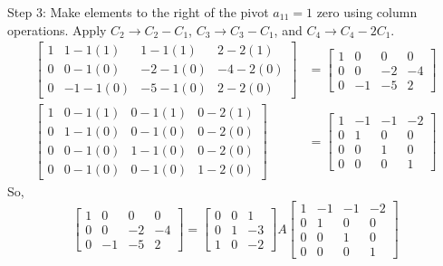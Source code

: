 \documentclass{article}
\begin{document}
Step 3: Make elements to the right of the pivot $a_{11}=1$ zero using column operations.
Apply $C_2 \to C_2 - C_1$, $C_3 \to C_3 - C_1$, and $C_4 \to C_4 - 2C_1$.
\begin{align*} \begin{bmatrix} 1 & 1 - 1(1) & 1 - 1(1) & 2 - 2(1) \\ 0 & 0 - 1(0) & -2 - 1(0) & -4 - 2(0) \\ 0 & -1 - 1(0) & -5 - 1(0) & 2 - 2(0) \end{bmatrix} &= \begin{bmatrix} 1 & 0 & 0 & 0 \\ 0 & 0 & -2 & -4 \\ 0 & -1 & -5 & 2 \end{bmatrix} \\ \begin{bmatrix} 1 & 0 - 1(1) & 0 - 1(1) & 0 - 2(1) \\ 0 & 1 - 1(0) & 0 - 1(0) & 0 - 2(0) \\ 0 & 0 - 1(0) & 1 - 1(0) & 0 - 2(0) \\ 0 & 0 - 1(0) & 0 - 1(0) & 1 - 2(0) \end{bmatrix} &= \begin{bmatrix} 1 & -1 & -1 & -2 \\ 0 & 1 & 0 & 0 \\ 0 & 0 & 1 & 0 \\ 0 & 0 & 0 & 1 \end{bmatrix}\end{align*}
So,
\[ \begin{bmatrix} 1 & 0 & 0 & 0 \\ 0 & 0 & -2 & -4 \\ 0 & -1 & -5 & 2 \end{bmatrix} = \begin{bmatrix} 0 & 0 & 1 \\ 0 & 1 & -3 \\ 1 & 0 & -2 \end{bmatrix} A \begin{bmatrix} 1 & -1 & -1 & -2 \\ 0 & 1 & 0 & 0 \\ 0 & 0 & 1 & 0 \\ 0 & 0 & 0 & 1 \end{bmatrix} \]
\end{document}
